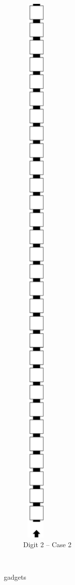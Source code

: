 \begin{itemize}
\begin{figure}[H]
\begin{subfigure}[t]{0.24\textwidth}
                \includegraphics[width=0.15\textwidth]{warping_pre_warp_case2_digit2_msr}
                \caption{\label{fig:pre_warp_case2_digit2_msr} Digit 2 -- Case 2}
            \end{subfigure}%
            ~
            \caption{\label{fig:pre_warp_gadgets} {\prewarp} gadgets }
        \end{figure}



\end{itemize}
